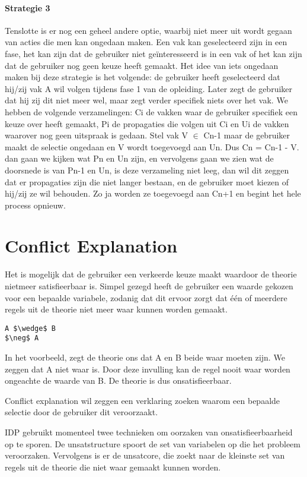 \paragraph{Strategie 3}
Tenslotte is er nog een geheel andere optie, waarbij niet meer uit wordt gegaan van acties die men kan ongedaan maken. Een vak kan geselecteerd zijn in een fase, het kan zijn dat de gebruiker niet ge\"{i}nteresseerd is in een vak of het kan zijn dat de gebruiker nog geen keuze heeft gemaakt. Het idee van iets ongedaan maken bij deze strategie is het volgende: de gebruiker heeft geselecteerd dat hij/zij vak A wil volgen tijdens fase 1 van de opleiding. Later zegt de gebruiker dat hij zij dit niet meer wel, maar zegt verder specifiek niets over het vak. We hebben de volgende verzamelingen: Ci de vakken waar de gebruiker specifiek een keuze over heeft gemaakt, Pi de propagaties die volgen uit Ci en Ui de vakken waarover nog geen uitspraak is gedaan. Stel vak V $\in$ Cn-1 maar de gebruiker maakt de selectie ongedaan en V wordt toegevoegd aan Un. Dus Cn = Cn-1 - V. dan gaan we kijken wat Pn en Un zijn, en vervolgens gaan we zien wat de doorsnede is van Pn-1 en Un, is deze verzameling niet leeg, dan wil dit zeggen dat er propagaties zijn die niet langer bestaan, en de gebruiker moet kiezen of hij/zij ze wil behouden. Zo ja worden ze toegevoegd aan Cn+1 en begint het hele process opnieuw.

\section{Conflict Explanation}
Het is mogelijk dat de gebruiker een verkeerde keuze maakt waardoor de theorie nietmeer satisfieerbaar is. Simpel gezegd heeft de gebruiker een waarde gekozen voor een bepaalde variabele, zodanig dat dit ervoor zorgt dat \'{e}\'{e}n of meerdere regels uit de theorie niet meer waar kunnen worden gemaakt.

\begin{lstlisting}[mathescape]
A $\wedge$ B
$\neg$ A
\end{lstlisting}

In het voorbeeld, zegt de theorie ons dat A en B beide waar moeten zijn. We zeggen dat A niet waar is. Door deze invulling kan de regel nooit waar worden ongeachte de waarde van B. De theorie is dus onsatisfieerbaar. 

Conflict explanation wil zeggen een verklaring zoeken waarom een bepaalde selectie door de gebruiker dit veroorzaakt. 

IDP gebruikt momenteel twee technieken om oorzaken van onsatisfieerbaarheid op te sporen. De unsatstructure spoort de set van variabelen op die het probleem veroorzaken. Vervolgens is er de unsatcore, die zoekt naar de kleinste set van regels uit de theorie die niet waar gemaakt kunnen worden.

